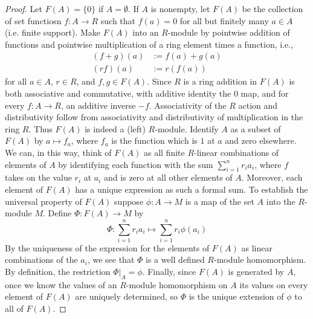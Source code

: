 \documentclass[12pt, a4paper, oneside, openright, titlepage]{book}
\begin{document}
\begin{proof}
    Let $F(A) = \{0\}$ if $A = \emptyset$. If $A$ is nonempty, let $F(A)$ be the collection of set functiosn $f:A\rightarrow R$ such that $f(a) = 0$ for all but finitely many $a \in A$ (i.e. finite support). Make $F(A)$ into an $R$-module by pointwise addition of functions and pointwise multiplication of a ring element times a function, i.e., \begin{align*}
        (f+g)(a) &:= f(a)+g(a) \\
        (rf)(a) &:= r(f(a)) 
    \end{align*}
    for all $a \in A$, $r \in R$, and $f,g \in F(A)$. Since $R$ is a ring addition in $F(A)$ is both associative and commutative, with additive identity the $0$ map, and for every $f:A\rightarrow R$, an additive inverse $-f$. Associativity of the $R$ action and distributivity follow from associativity and distributivity of multiplication in the ring $R$. Thus $F(A)$ is indeed a (left) $R$-module. Identify $A$ as a subset of $F(A)$ by $a \mapsto f_a$, where $f_a$ is the function which is $1$ at $a$ and zero elsewhere. We can, in this way, think of $F(A)$ as all finite $R$-linear combinations of elements of $A$ by identifying each function with the sum $\sum_{i=1}^nr_ia_i$, where $f$ takes on the value $r_i$ at $a_i$ and is zero at all other elements of $A$. Moreover, each element of $F(A)$ has a unique expression as such a formal sum. To establish the universal property of $F(A)$ suppose $\phi:A\rightarrow M$ is a map of the set $A$ into the $R$-module $M$. Define $\Phi:F(A)\rightarrow M$ by \begin{equation*}
        \Phi:\sum\limits_{i=1}^nr_ia_i\mapsto\sum\limits_{i=1}^nr_i\phi(a_i)
    \end{equation*}
    By the uniqueness of the expression for the elements of $F(A)$ as linear combinations of the $a_i$, we see that $\Phi$ is a well defined $R$-module homomorphism. By definition, the restriction $\Phi\vert_A = \phi$. Finally, since $F(A)$ is generated by $A$, once we know the values of an $R$-module homomorphism on $A$ its values on every element of $F(A)$ are uniquely determined, so $\Phi$ is the unique extension of $\phi$ to all of $F(A)$.
\end{proof}
\end{document}
